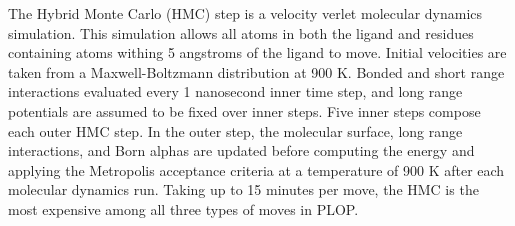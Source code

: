 The Hybrid Monte Carlo (HMC) \cite{duane1987hybrid} step is a velocity verlet molecular dynamics simulation.
This simulation allows all atoms in both the ligand and residues containing atoms withing 5 angstroms of the ligand to move.
Initial velocities are taken from a Maxwell-Boltzmann distribution at 900 K.
Bonded and short range interactions evaluated every 1 nanosecond inner time step, and long range potentials are assumed to be fixed over inner steps.
Five inner steps compose each outer HMC step.
In the outer step, the molecular surface, long range interactions, and Born alphas are updated before computing the energy and applying the Metropolis acceptance criteria at a temperature of 900 K after each molecular dynamics run.
Taking up to 15 minutes per move, the HMC is the most expensive among all three types of moves in PLOP.




